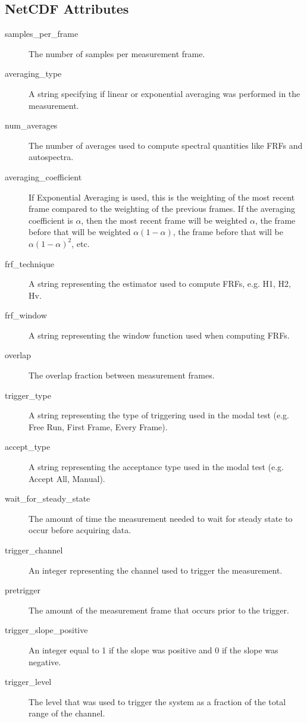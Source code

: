 \documentclass[pdf,12pt,report]{SANDreport}
\begin{document}
    \subsection{NetCDF Attributes}
    \begin{description}
        \item[samples\_per\_frame] The number of samples per measurement frame.
        \item[averaging\_type] A string specifying if linear or exponential averaging was performed in the measurement.
        \item[num\_averages] The number of averages used to compute spectral quantities like \ac{FRF}s and autospectra.
        \item[averaging\_coefficient] If Exponential Averaging is used, this is the weighting of the most recent frame compared to the weighting of the previous frames.  If the averaging coefficient is $\alpha$, then the most recent frame will be weighted $\alpha$, the frame before that will be weighted $\alpha(1-\alpha)$, the frame before that will be $\alpha(1-\alpha)^2$, etc.
        \item[frf\_technique] A string representing the estimator used to compute \ac{FRF}s, e.g. H1, H2, Hv.
        \item[frf\_window] A string representing the window function used when computing \ac{FRF}s.
        \item[overlap] The overlap fraction between measurement frames.
        \item[trigger\_type] A string representing the type of triggering used in the modal test (e.g. Free Run, First Frame, Every Frame).
        \item[accept\_type] A string representing the acceptance type used in the modal test (e.g. Accept All, Manual).
        \item[wait\_for\_steady\_state] The amount of time the measurement needed to wait for steady state to occur before acquiring data.
        \item[trigger\_channel] An integer representing the channel used to trigger the measurement.
        \item[pretrigger] The amount of the measurement frame that occurs prior to the trigger.
        \item[trigger\_slope\_positive] An integer equal to 1 if the slope was positive and 0 if the slope was negative.
        \item[trigger\_level] The level that was used to trigger the system as a fraction of the total range of the channel.

\end{description}
\end{document}
